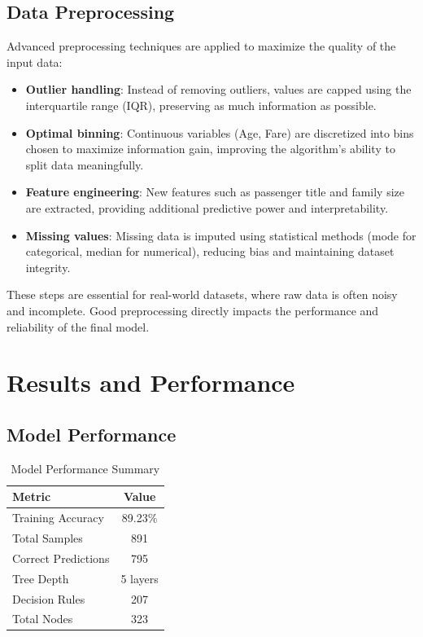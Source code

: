 \documentclass[conference]{IEEEtran}
\begin{document}
\subsection{Data Preprocessing}
Advanced preprocessing techniques are applied to maximize the quality of the input data:
\begin{itemize}
    \item \textbf{Outlier handling}: Instead of removing outliers, values are capped using the interquartile range (IQR), preserving as much information as possible.
    \item \textbf{Optimal binning}: Continuous variables (Age, Fare) are discretized into bins chosen to maximize information gain, improving the algorithm's ability to split data meaningfully.
    \item \textbf{Feature engineering}: New features such as passenger title and family size are extracted, providing additional predictive power and interpretability.
    \item \textbf{Missing values}: Missing data is imputed using statistical methods (mode for categorical, median for numerical), reducing bias and maintaining dataset integrity.
\end{itemize}
These steps are essential for real-world datasets, where raw data is often noisy and incomplete. Good preprocessing directly impacts the performance and reliability of the final model.

\section{Results and Performance}
\subsection{Model Performance}
\begin{table}[h]
\centering
\begin{tabular}{|l|c|}
\hline
Metric & Value \\
\hline
Training Accuracy & 89.23\% \\
Total Samples & 891 \\
Correct Predictions & 795 \\
Tree Depth & 5 layers \\
Decision Rules & 207 \\
Total Nodes & 323 \\
\hline
\end{tabular}
\caption{Model Performance Summary}
\end{table}
\end{document}
